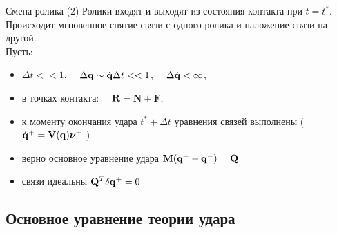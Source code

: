 \documentclass{beamer}
\begin{document}
\begin{frame}{Смена ролика}
    \textcolor{Periwinkle}{(2) Ролики входят и выходят из состояния контакта при $t = t^*$.}\\
    Происходит мгновенное снятие связи с одного ролика и наложение связи на другой.\\
    Пусть:
    \begin{itemize}
        \item $\Delta t << 1$, $\quad \Delta \mathbf{q} \sim \dot{\mathbf{q}}\Delta t << 1$, $\quad \Delta \dot{\mathbf{q}} < \infty$,
        \item в точках контакта: $\quad \mathbf{R} = \mathbf{N} + \mathbf{F}$,
        \item к моменту окончания удара $t^*+\Delta t$ уравнения связей выполнены (\enspace $\dot{\mathbf{q}}^+ = \mathbf{V}(\mathbf{q})\boldsymbol{\mathbf{\nu}}^+ \ $)
        \item верно основное уравнение удара \enspace $\mathbf{M} (\dot{\mathbf{q}}^+ - \dot{\mathbf{q}}^-) = \mathbf{Q}$
        \item связи идеальны \enspace $\mathbf{Q}^T\delta\mathbf{q}^+ = 0$
    \end{itemize}
\end{frame}

\subsection{Основное уравнение теории удара}
\end{document}
